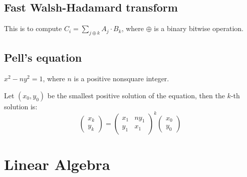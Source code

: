 \subsection{Fast Walsh-Hadamard transform}
This is to compute $C_i = \sum_{j \oplus k} A_j \cdot B_k$, where $\oplus$ is a binary bitwise operation.


\subsection{Pell's equation}
$x^2 - ny^2 = 1$, where $n$ is a positive nonsquare integer. \par
Let $(x_0, y_0)$ be the smallest positive solution of the equation, then the $k$-th solution is:
$$\begin{pmatrix}x_k \\ y_k\end{pmatrix} =
\begin{pmatrix}
  x_1 & ny_1 \\
  y_1 & x_1
\end{pmatrix} ^k
\begin{pmatrix}x_0 \\ y_0\end{pmatrix}$$



\section{Linear Algebra}

